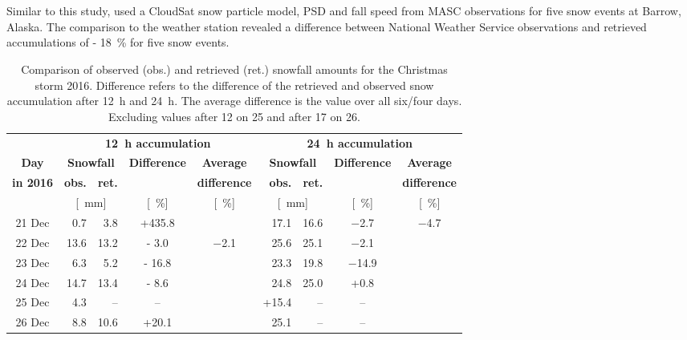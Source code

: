 \\
\\
Similar to this study, \citet{cooper_variational_2017} used a CloudSat snow particle model, PSD and fall speed from MASC observations for five snow events at Barrow, Alaska. The comparison to the weather station revealed a difference between National Weather Service observations and retrieved accumulations of \SI{- 18}{\percent} for five snow events.
\begin{table}[t!]
	\begin{center}
		\caption{Comparison of observed (obs.) and retrieved (ret.) snowfall amounts for the Christmas storm 2016. Difference refers to the difference of the retrieved and observed snow accumulation after \SI{12}{\hour} and \SI{24}{\hour}. The average difference is the value over all six/four days. Excluding values after \SI{12}{\UTC} on \SI{25}{\dec} and after \SI{17}{\UTC} on \SI{26}{\dec}.}\label{tab:res:ret_error}
		\begin{tabular}{c||r|r|c|c||r|r|c|c}
			\hline \hline
			& \multicolumn{4}{c||}{\textbf{\SI{12}{\hour} accumulation}} & \multicolumn{4}{c}{\textbf{\SI{24}{\hour} accumulation}}    \\ \cline{2-9}
			\textbf{Day} & \multicolumn{2}{c|}{\textbf{Snowfall}} & \textbf{Difference} & \textbf{Average} &  \multicolumn{2}{c|}{\textbf{Snowfall}} & \textbf{Difference} & \textbf{Average}  \\\cline{2-3} \cline{6-7}
			\textbf{in 2016} & \textbf{obs.} & \textbf{ret.} & & \textbf{difference} & \textbf{obs.} & \textbf{ret.} & & \textbf{difference} \\\cline{2-9}
			& \multicolumn{2}{c|}{[\SI{}{\mm}]} & [\SI{}{\percent}] & [\SI{}{\percent}] & \multicolumn{2}{c|}{[\SI{}{\mm}]} & [\SI{}{\percent}] & [\SI{}{\percent}] \\ \hline\hline
			\num{21} Dec & \num{0.7} & \num{3.8} & +\num{435.8} &  & \num{17.1} & \num{16.6} & \num{-2.7} & \multirow{4}{*}{\num{-4.7}}   \\\cline{1-5}\cline{6-8}
			\num{22} Dec & \num{13.6}& \num{13.2} & \num{- 3.0} & \multirow{5}{*}{\num{-2.1}} & \num{25.6} &\num{25.1} & \num{-2.1} &   \\\cline{1-4}\cline{6-8}
			\num{23} Dec & \num{6.3} &\num{5.2} & \num{- 16.8} & & \num{23.3}& \num{19.8} & \num{-14.9} &   \\\cline{1-4}\cline{6-8}
			\num{24} Dec & \num{14.7} & \num{13.4} & \num{- 8.6} && \num{24.8} & \num{25.0} & +\num{0.8} &   \\\cline{1-4}\cline{6-9}
			\num{25} Dec &  \num{4.3} & -- & -- & & +\num{15.4} & -- & -- & \\\cline{1-4}\cline{6-9}
			\num{26} Dec & \num{8.8} & \num{10.6} & +\num{20.1} &  &  \num{25.1} &-- & -- &  \\\hline\hline
		\end{tabular}
	\end{center}
\end{table}
